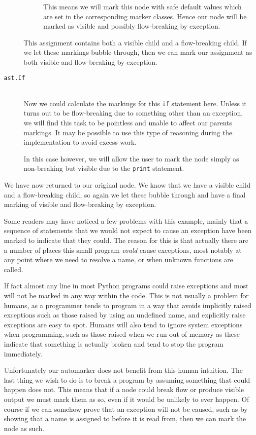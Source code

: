 \documentclass[twoside,a4paper]{report}
\begin{document}
\begin{description}
\begin{description}
    This means we will mark this node with safe default values which are set in the corresponding marker classes. Hence our node will be marked
    as visible and possibly flow-breaking by exception.
  \end{description}
  This assignment contains both a visible child and a flow-breaking child. If we let these markings bubble through, then we can mark our assignment
  as both visible and flow-breaking by exception. 

  \item[\texttt{ast.If}] \hfill \\
  Now we could calculate the markings for this \texttt{if} statement here. Unless it turns out to be flow-breaking due to something other than an
  exception, we will find this task to be pointless and unable to affect our parents markings. It may be possible to use this type of reasoning
  during the implementation to avoid excess work.

  In this case however, we will allow the user to mark the node simply as non-breaking but visible due to the \texttt{print} statement.
\end{description}

We have now returned to our original node. We know that we have a visible child and a flow-breaking child, so again we let these bubble through
and have a final marking of visible and flow-breaking by exception.

Some readers may have noticed a few problems with this example, mainly that a sequence of statements that we would not expect to cause an exception
have been marked to indicate that they could. The reason for this is that actually there are a number of places this small program \textit{could} cause
exceptions, most notably at any point where we need to resolve a name, or when unknown functions are called.

If fact almost any line in most Python programs could raise exceptions and most will not be marked in any way within the code. This is not usually a
problem for humans, as a programmer tends to program in a way that avoids implicitly raised exceptions such as those raised by using an undefined name,
and explicitly raise exceptions are easy to spot. Humans will also tend to ignore system exceptions when programming, such as those raised when we run
out of memory as these indicate that something is actually broken and tend to stop the program immediately.

Unfortunately our automarker does not benefit from this human intuition. The last thing we wish to do is to break a program by assuming something that
could happen does not. This means that if a node could break flow or produce visible output we must mark them as so, even if it would be unlikely to ever
happen. Of course if we can somehow prove that an exception will not be caused, such as by showing that a name is assigned to before it is read from,
then we can mark the node as such.
\end{document}
